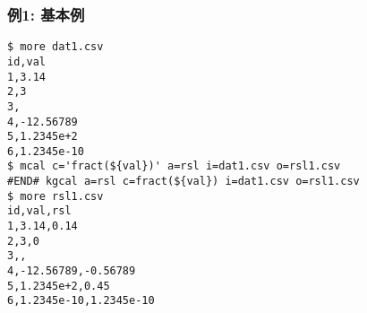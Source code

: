 \subsubsection*{例1: 基本例}



\begin{Verbatim}[baselinestretch=0.7,frame=single]
$ more dat1.csv
id,val
1,3.14
2,3
3,
4,-12.56789
5,1.2345e+2
6,1.2345e-10
$ mcal c='fract(${val})' a=rsl i=dat1.csv o=rsl1.csv
#END# kgcal a=rsl c=fract(${val}) i=dat1.csv o=rsl1.csv
$ more rsl1.csv
id,val,rsl
1,3.14,0.14
2,3,0
3,,
4,-12.56789,-0.56789
5,1.2345e+2,0.45
6,1.2345e-10,1.2345e-10
\end{Verbatim}
